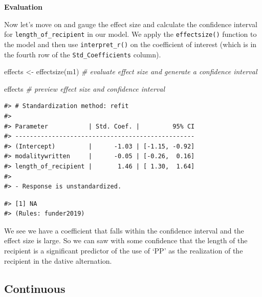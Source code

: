 \documentclass[
  letterpaper,
]{scrbook}
\newenvironment{Shaded}{\begin{snugshade}}{\end{snugshade}}
\newcommand{\CommentTok}[1]{\textcolor[rgb]{0.00,0.00,0.00}{\textit{#1}}}
\newcommand{\DecValTok}[1]{\textcolor[rgb]{0.00,0.00,0.00}{#1}}
\newcommand{\FunctionTok}[1]{\textcolor[rgb]{0.00,0.00,0.00}{#1}}
\newcommand{\NormalTok}[1]{\textcolor[rgb]{0.00,0.00,0.00}{#1}}
\newcommand{\OtherTok}[1]{\textcolor[rgb]{0.00,0.00,0.00}{#1}}
\newcommand{\SpecialCharTok}[1]{\textcolor[rgb]{0.00,0.00,0.00}{#1}}
\begin{document}
\textbf{Evaluation}

Now let's move on and gauge the effect size and calculate the confidence
interval for \texttt{length\_of\_recipient} in our model. We apply the
\texttt{effectsize()} function to the model and then use
\texttt{interpret\_r()} on the coefficient of interest (which is in the
fourth row of the \texttt{Std\_Coefficients} column).

\begin{Shaded}
\begin{Highlighting}[]
\NormalTok{effects }\OtherTok{\textless{}{-}} \FunctionTok{effectsize}\NormalTok{(m1) }\CommentTok{\# evaluate effect size and generate a confidence interval}

\NormalTok{effects }\CommentTok{\# preview effect size and confidence interval}
\end{Highlighting}
\end{Shaded}

\begin{verbatim}
#> # Standardization method: refit
#> 
#> Parameter           | Std. Coef. |         95% CI
#> -------------------------------------------------
#> (Intercept)         |      -1.03 | [-1.15, -0.92]
#> modalitywritten     |      -0.05 | [-0.26,  0.16]
#> length_of_recipient |       1.46 | [ 1.30,  1.64]
#> 
#> - Response is unstandardized.
\end{verbatim}

\begin{Shaded}
\end{Shaded}

\begin{verbatim}
#> [1] NA
#> (Rules: funder2019)
\end{verbatim}

We see we have a coefficient that falls within the confidence interval
and the effect size is large. So we can saw with some confidence that
the length of the recipient is a significant predictor of the use of
`PP' as the realization of the recipient in the dative alternation.

\hypertarget{continuous-2}{%
\subsection{Continuous}\label{continuous-2}}
\end{document}
